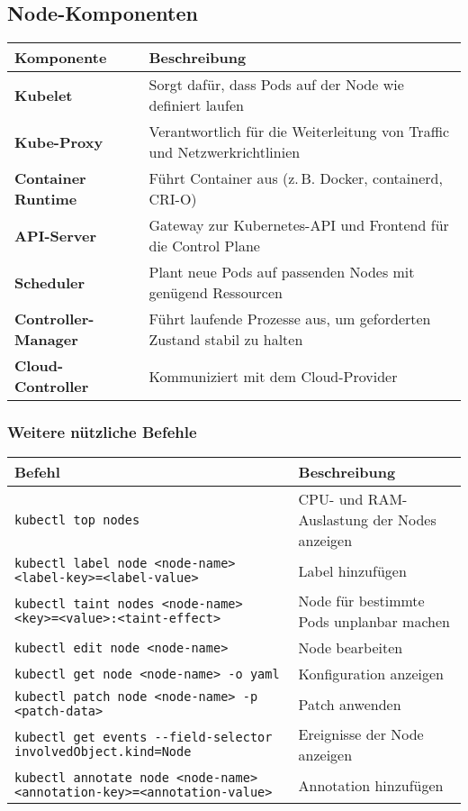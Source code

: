 \subsection{Node-Komponenten}
\begin{tabular}{|p{}|p{}|}
\hline
\textbf{Komponente} & \textbf{Beschreibung} \\
\hline
\textbf{Kubelet} & Sorgt dafür, dass Pods auf der Node wie definiert laufen \\
\textbf{Kube-Proxy} & Verantwortlich für die Weiterleitung von Traffic und Netzwerkrichtlinien \\
\textbf{Container Runtime} & Führt Container aus (z.\,B. Docker, containerd, CRI-O) \\
\textbf{API-Server} & Gateway zur Kubernetes-API und Frontend für die Control Plane \\
\textbf{Scheduler} & Plant neue Pods auf passenden Nodes mit genügend Ressourcen\\
\textbf{Controller-Manager} & Führt laufende Prozesse aus, um geforderten Zustand stabil zu halten \\
\textbf{Cloud-Controller} & Kommuniziert mit dem Cloud-Provider \\
\hline
\end{tabular}
\subsubsection{Weitere nützliche Befehle}
\begin{tabular}{|p{}|p{}|}
\hline
\textbf{Befehl} & \textbf{Beschreibung} \\
\hline
\texttt{kubectl top nodes} & CPU- und RAM-Auslastung der Nodes anzeigen \\
\texttt{kubectl label node <node-name> <label-key>=<label-value>} & Label hinzufügen \\
\texttt{kubectl taint nodes <node-name> <key>=<value>:<taint-effect>} & Node für bestimmte Pods unplanbar machen \\
\texttt{kubectl edit node <node-name>} & Node bearbeiten \\
\texttt{kubectl get node <node-name> -o yaml} & Konfiguration anzeigen \\
\texttt{kubectl patch node <node-name> -p <patch-data>} & Patch anwenden \\
\texttt{kubectl get events {-}{-}field-selector involvedObject.kind=Node} & Ereignisse der Node anzeigen \\
\texttt{kubectl annotate node <node-name> <annotation-key>=<annotation-value>} & Annotation hinzufügen \\
\hline
\end{tabular}
